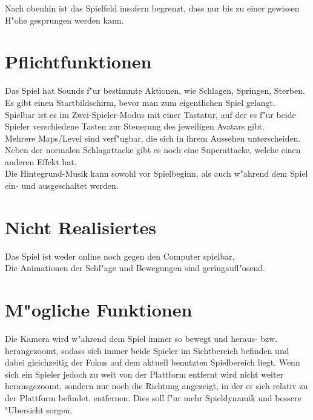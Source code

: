\documentclass[a4paper, 11pt]{article}
\begin{document}
    \noindent
    Nach obenhin ist das Spielfeld insofern begrenzt, dass nur bis zu einer gewissen H"ohe gesprungen werden kann.

    \section{Pflichtfunktionen}\label{sec:muss}
    Das Spiel hat Sounds f"ur bestimmte Aktionen, wie Schlagen, Springen, Sterben.\\

    \noindent
    Es gibt einen Startbildschirm, bevor man zum eigentlichen Spiel gelangt.\\

    \noindent
    Spielbar ist es im \glqq Zwei-Spieler-Modus\grqq{} mit einer Tastatur, auf der es f"ur beide Spieler verschiedene
    Tasten zur Steuerung des jeweiligen Avatars gibt.\\

    \noindent
    Mehrere Maps/Level sind verf"ugbar, die sich in ihrem Aussehen unterscheiden.\\

    \noindent
    Neben der normalen Schlagattacke gibt es noch eine Superattacke, welche einen anderen Effekt hat.\\

    \noindent
    Die Hintegrund-Musik kann sowohl vor Spielbeginn, als auch w"ahrend dem Spiel ein- und ausgeschaltet werden.

    \section{Nicht Realisiertes}\label{sec:kann-nicht}

    Das Spiel ist weder online noch gegen den Computer spielbar.\\

    \noindent
    Die Animationen der Schl"age und Bewegungen sind geringaufl"osend.

    \section{M"ogliche Funktionen}\label{sec:kann}

    Die Kamera wird w"ahrend dem Spiel immer so bewegt und heraus- bzw. herangezoomt, sodass sich immer beide
    Spieler im Sichtbereich befinden und dabei gleichzeitig der Fokus auf dem aktuell benutzten Spielbereich liegt. Wenn sich
    ein Spieler jedoch zu weit von der Plattform entfernt wird nicht weiter herausgezoomt, sondern nur noch die Richtung angezeigt,
    in der er sich relativ zu der Plattform befindet. entfernen. Dies soll f"ur mehr Spieldynamik und bessere "Ubersicht sorgen.\\
\end{document}
